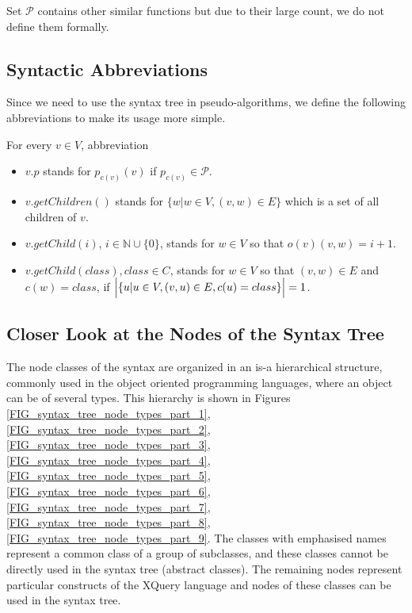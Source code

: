 Set $\mathcal{P}$ contains other similar functions but due to their large count, we do not define them formally.

\subsection{Syntactic Abbreviations}
Since we need to use the syntax tree in pseudo-algorithms, we define the following abbreviations to make its usage more simple.

For every $v \in V$, abbreviation
\begin{itemize}
\item $v.p$ stands for $p_{c(v)}(v)$ if $p_{c(v)} \in \mathcal{P}$.
\item $v.getChildren()$ stands for $\{w | w \in V, (v,w) \in E\}$ which is a set of all children of $v$.
\item $v.getChild(i)$, $i \in \mathbb{N} \cup \{0\}$, stands for $w \in V$ so that $o(v)(v,w) = i + 1$.
\item $v.getChild(class), class \in C$, stands for $w \in V$ so that $(v,w) \in E$ and $c(w) = class$, if $\Bigl | \{u | u \in V, (v,u) \in E, c(u) = class\}\Bigr | = 1$.
\end{itemize}


\subsection{Closer Look at the Nodes of the Syntax Tree}
The node classes of the syntax are organized in an is-a hierarchical structure, commonly used in the object oriented programming languages, where an object can be of several types. This hierarchy is shown in Figures \ref{FIG_syntax_tree_node_types_part_1}, \ref{FIG_syntax_tree_node_types_part_2}, \ref{FIG_syntax_tree_node_types_part_3}, \ref{FIG_syntax_tree_node_types_part_4}, \ref{FIG_syntax_tree_node_types_part_5}, \ref{FIG_syntax_tree_node_types_part_6}, \ref{FIG_syntax_tree_node_types_part_7}, \ref{FIG_syntax_tree_node_types_part_8}, \ref{FIG_syntax_tree_node_types_part_9}. The classes with emphasised names represent a common class of a group of subclasses, and these classes cannot be directly used in the syntax tree (abstract classes). The remaining nodes represent particular constructs of the XQuery language and nodes of these classes can be used in the syntax tree. 


